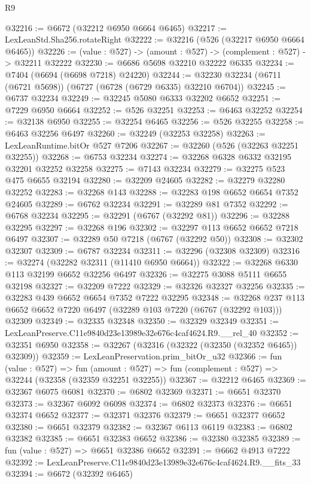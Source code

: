 \begin{lexlean}{R9}
\begin{coremodule}
@32216 := @6672 (@32212 @6950 @6664 @6465)
@32217 := LexLeanStd.Sha256.rotateRight
@32222 := @32216 (@526 (@32217 @6950 @6664 @6465))
@32226 := (value : @527) -> (amount : @527) -> (complement : @527) -> @32211 @32222
@32230 := @6686 @5698 @32210 @32222 @6335
@32234 := @7404 (@6694 (@6698 @7218) @24220)
@32244 := @32230 @32234 (@6711 (@6721 @5698)) (@6727 (@6728 (@6729 @6335) @32210 @6704))
@32245 := @6737 @32234
@32249 := @32245 @5080 @6333 @32202 @6652
@32251 := @7229 @6950 @6664
@32252 := @526 @32251
@32253 := @6463 @32252
@32254 := @32138 @6950
@32255 := @32254 @6465
@32256 := @526 @32255
@32258 := @6463 @32256 @6497
@32260 := @32249 (@32253 @32258)
@32263 := LexLeanRuntime.bitOr @527 @7206
@32267 := @32260 (@526 (@32263 @32251 @32255))
@32268 := @6753 @32234
@32274 := @32268 @6328 @6332 @32195 @32201 @32252 @32258
@32275 := @7143 @32234
@32279 := @32275 @523 @475 @6655 @32194
@32280 := @32209 @24605
@32282 := @32279 @32280 @32252
@32283 := @32268 @143
@32288 := @32283 @198 @6652 @6654 @7352 @24605
@32289 := @6762 @32234
@32291 := @32289 @81 @7352
@32292 := @6768 @32234
@32295 := @32291 (@6767 (@32292 @81))
@32296 := @32288 @32295
@32297 := @32268 @196
@32302 := @32297 @113 @6652 @6652 @7218 @6497
@32307 := @32289 @50 @7218 (@6767 (@32292 @50))
@32308 := @32302 @32307
@32309 := @6787 @32234
@32311 := @32296 (@32308 @32309)
@32316 := @32274 (@32282 @32311 (@11410 @6950 @6664))
@32322 := @32268 @6330 @113 @32199 @6652 @32256 @6497
@32326 := @32275 @3088 @5111 @6655 @32198
@32327 := @32209 @7222
@32329 := @32326 @32327 @32256
@32335 := @32283 @439 @6652 @6654 @7352 @7222 @32295
@32348 := @32268 @237 @113 @6652 @6652 @7220 @6497 (@32289 @103 @7220 (@6767 (@32292 @103))) @32309
@32349 := @32335 @32348
@32350 := @32329 @32349
@32351 := LexLeanPreserve.C11e9840d23e13989e32e676c4caf4624.R9.__rel_40
@32352 := @32351 @6950
@32358 := @32267 (@32316 (@32322 (@32350 (@32352 @6465)) @32309))
@32359 := LexLeanPreservation.prim_bitOr_u32
@32366 := fun (value : @527) =>
  fun (amount : @527) => fun (complement : @527) => @32244 (@32358 (@32359 @32251 @32255))
@32367 := @32212 @6465
@32369 := @32367 @6075 @6081
@32370 := @6802 @32369
@32371 := @6651 @32370
@32373 := @32367 @6092 @6098
@32374 := @6802 @32373
@32376 := @6651 @32374 @6652
@32377 := @32371 @32376
@32379 := @6651 @32377 @6652
@32380 := @6651 @32379
@32382 := @32367 @6113 @6119
@32383 := @6802 @32382
@32385 := @6651 @32383 @6652
@32386 := @32380 @32385
@32389 := fun (value : @527) => @6651 @32386 @6652
@32391 := @6662 @4913 @7222
@32392 := LexLeanPreserve.C11e9840d23e13989e32e676c4caf4624.R9.__fits_33
@32394 := @6672 (@32392 @6465)

\end{coremodule}
\end{lexlean}
